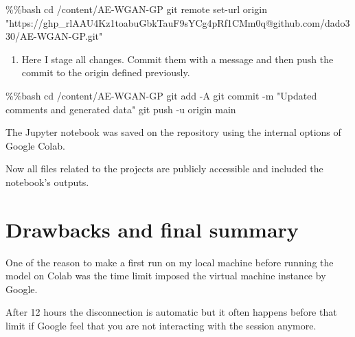 \documentclass[
  letterpaper,
  DIV=11,
  numbers=noendperiod]{scrreprt}
\newenvironment{Shaded}{\begin{snugshade}}{\end{snugshade}}
\newcommand{\BuiltInTok}[1]{\textcolor[rgb]{0.00,0.23,0.31}{#1}}
\newcommand{\NormalTok}[1]{\textcolor[rgb]{0.00,0.23,0.31}{#1}}
\newcommand{\OperatorTok}[1]{\textcolor[rgb]{0.37,0.37,0.37}{#1}}
\newcommand{\StringTok}[1]{\textcolor[rgb]{0.13,0.47,0.30}{#1}}
\providecommand{\tightlist}{%
  \setlength{\itemsep}{0pt}\setlength{\parskip}{0pt}}\usepackage{longtable,booktabs,array}
\begin{document}
\begin{Shaded}
\begin{Highlighting}[]
\OperatorTok{\%\%}\NormalTok{bash}
\NormalTok{cd }\OperatorTok{/}\NormalTok{content}\OperatorTok{/}\NormalTok{AE}\OperatorTok{{-}}\NormalTok{WGAN}\OperatorTok{{-}}\NormalTok{GP}
\NormalTok{git remote }\BuiltInTok{set}\OperatorTok{{-}}\NormalTok{url origin }\StringTok{"https://ghp\_rlAAU4Kz1toabuGbkTauF9sYCg4pRf1CMm0q@github.com/dado330/AE{-}WGAN{-}GP.git"}
\end{Highlighting}
\end{Shaded}

\begin{enumerate}
\def\labelenumi{\arabic{enumi}.}
\setcounter{enumi}{5}
\tightlist
\item
  Here I stage all changes. Commit them with a message and then push the
  commit to the origin defined previously.
\end{enumerate}

\begin{Shaded}
\begin{Highlighting}[]
\OperatorTok{\%\%}\NormalTok{bash}
\NormalTok{cd }\OperatorTok{/}\NormalTok{content}\OperatorTok{/}\NormalTok{AE}\OperatorTok{{-}}\NormalTok{WGAN}\OperatorTok{{-}}\NormalTok{GP}
\NormalTok{git add }\OperatorTok{{-}}\NormalTok{A}
\NormalTok{git commit }\OperatorTok{{-}}\NormalTok{m }\StringTok{"Updated comments and generated data"}
\NormalTok{git push }\OperatorTok{{-}}\NormalTok{u origin main}
\end{Highlighting}
\end{Shaded}

The Jupyter notebook was saved on the repository using the internal
options of Google Colab.

Now all files related to the projects are publicly accessible and
included the notebook's outputs.

\hypertarget{drawbacks-and-final-summary}{%
\chapter{Drawbacks and final
summary}\label{drawbacks-and-final-summary}}

One of the reason to make a first run on my local machine before running
the model on Colab was the time limit imposed the virtual machine
instance by Google.

After 12 hours the disconnection is automatic but it often happens
before that limit if Google feel that you are not interacting with the
session anymore.
\end{document}
